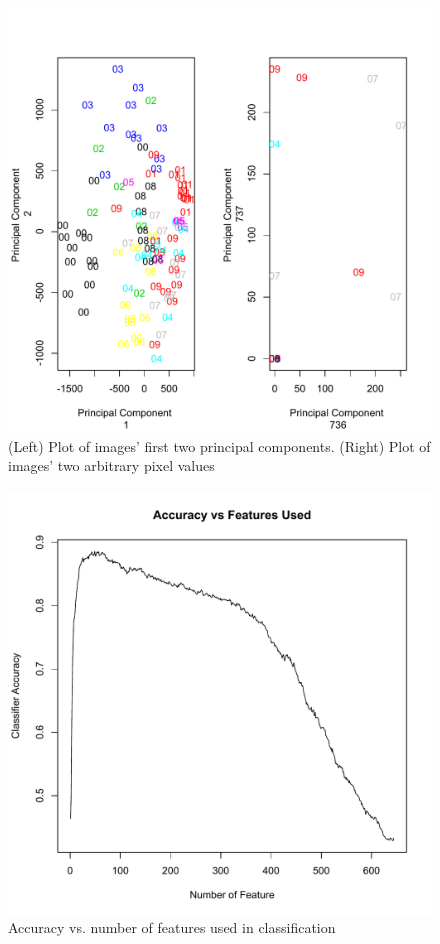 \documentclass[twocolumn]{article}
\begin{document}
\begin{figure}
    \centering
    \includegraphics{PCAComponentPlot.pdf}
    \caption{(Left) Plot of images' first two principal components. (Right) Plot of images' two arbitrary pixel values}
    \label{fig:pcaplot}
\end{figure}
\begin{figure}
    \centering
    \includegraphics{figs/accuracyvsfeatures.pdf}
    \caption{Accuracy vs. number of features used in classification}
\end{figure}
\end{document}
